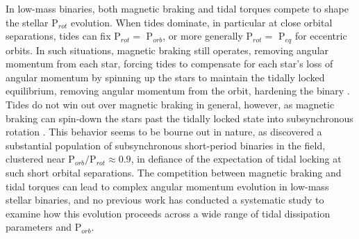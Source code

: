 In low-mass binaries, both magnetic braking and tidal torques compete to shape the stellar P$_{rot}$ evolution. When tides dominate, in particular at close orbital separations, tides can fix P$_{rot} =$ P$_{orb}$, or more generally P$_{rot} =$ P$_{eq}$ for eccentric orbits. In such situations, magnetic braking still operates, removing angular momentum from each star, forcing tides to compensate for each star's loss of angular momentum by spinning up the stars to maintain the tidally locked equilibrium, removing angular momentum from the orbit, hardening the binary \citep[][]{Verbunt1981,Repetto2014,Fleming2018}. Tides do not win out over magnetic braking in general, however, as magnetic braking can spin-down the stars past the tidally locked state into subsynchronous rotation \citep[P$_{rot} >$ P$_{eq}$, ][]{Habets1989,Zahn1994,Keppens1997}. This behavior seems to be bourne out in nature, as \citet{Lurie2017} discovered a substantial population of subsynchronous short-period binaries in the \kepler field, clustered near P$_{orb}/$P$_{rot}{\approx} 0.9$, in defiance of the expectation of tidal locking at such short orbital separations. The competition between magnetic braking and tidal torques can lead to complex angular momentum evolution in low-mass stellar binaries, and no previous work has conducted a systematic study to examine how this evolution proceeds across a wide range of tidal dissipation parameters and P$_{orb}$.

 
